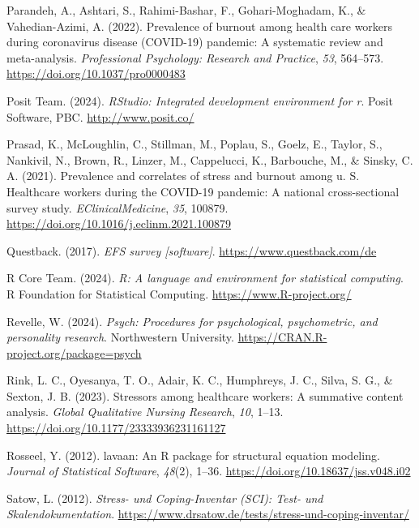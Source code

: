 \documentclass[
  man]{apa6}
\newlength{\cslhangindent}
\newenvironment{CSLReferences}[2] %
 {\begin{list}{}{%
  \setlength{\itemindent}{0pt}
  \setlength{\leftmargin}{0pt}
  \setlength{\parsep}{0pt}
  \ifodd #1
   \setlength{\leftmargin}{\cslhangindent}
   \setlength{\itemindent}{-1\cslhangindent}
  \fi
  \setlength{\itemsep}{#2\baselineskip}}}
 {\end{list}}
\begin{document}
\begin{CSLReferences}{1}{0}
Parandeh, A., Ashtari, S., Rahimi-Bashar, F., Gohari-Moghadam, K., \& Vahedian-Azimi, A. (2022). Prevalence of burnout among health care workers during coronavirus disease ({COVID-19}) pandemic: A systematic review and meta-analysis. \emph{Professional Psychology: Research and Practice}, \emph{53}, 564--573. \url{https://doi.org/10.1037/pro0000483}

Posit Team. (2024). \emph{RStudio: Integrated development environment for r}. Posit Software, PBC. \url{http://www.posit.co/}

Prasad, K., McLoughlin, C., Stillman, M., Poplau, S., Goelz, E., Taylor, S., Nankivil, N., Brown, R., Linzer, M., Cappelucci, K., Barbouche, M., \& Sinsky, C. A. (2021). Prevalence and correlates of stress and burnout among u. S. Healthcare workers during the COVID-19 pandemic: A national cross-sectional survey study. \emph{EClinicalMedicine}, \emph{35}, 100879. \url{https://doi.org/10.1016/j.eclinm.2021.100879}

Questback. (2017). \emph{EFS survey {[}software{]}}. \url{https://www.questback.com/de}

R Core Team. (2024). \emph{R: A language and environment for statistical computing}. R Foundation for Statistical Computing. \url{https://www.R-project.org/}

Revelle, W. (2024). \emph{Psych: Procedures for psychological, psychometric, and personality research}. Northwestern University. \url{https://CRAN.R-project.org/package=psych}

Rink, L. C., Oyesanya, T. O., Adair, K. C., Humphreys, J. C., Silva, S. G., \& Sexton, J. B. (2023). Stressors among healthcare workers: A summative content analysis. \emph{Global Qualitative Nursing Research}, \emph{10}, 1--13. \url{https://doi.org/10.1177/23333936231161127}

Rosseel, Y. (2012). {lavaan}: An {R} package for structural equation modeling. \emph{Journal of Statistical Software}, \emph{48}(2), 1--36. \url{https://doi.org/10.18637/jss.v048.i02}

Satow, L. (2012). \emph{{Stress- und Coping-Inventar (SCI): Test- und Skalendokumentation}}. \url{https://www.drsatow.de/tests/stress-und-coping-inventar/}


\end{CSLReferences}
\end{document}
